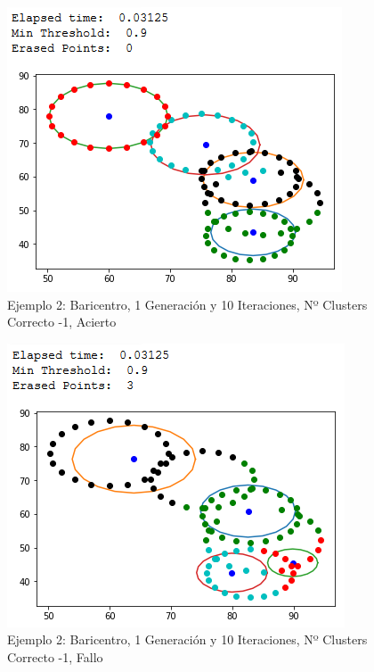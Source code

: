 \documentclass[conference,a4paper]{IEEEtran}
\begin{document}
\begin{figure}[H]
\centering
\includegraphics[scale=0.65]{Experimentacion/Ejemplo2/ej2_b_1_10_lc_correct}
\caption{Ejemplo 2: Baricentro, 1 Generación y 10 Iteraciones,  Nº Clusters Correcto -1, Acierto\\}
\end{figure}

\begin{figure}[H]
\centering
\includegraphics[scale=0.65]{Experimentacion/Ejemplo2/ej2_b_1_10_lc_wrong}
\caption{Ejemplo 2: Baricentro, 1 Generación y 10 Iteraciones,  Nº Clusters Correcto -1, Fallo\\}
\end{figure}
\end{document}
